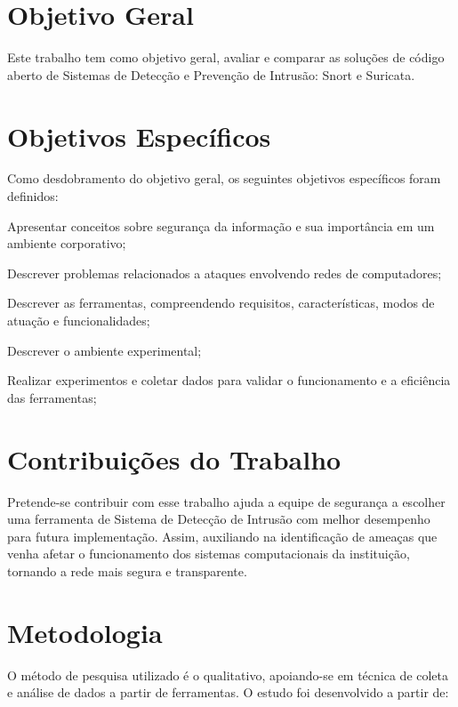 \section{Objetivo Geral} \label{sec:objectivo-geral}

Este trabalho tem como objetivo geral, avaliar e comparar as soluções de código aberto de Sistemas de Detecção e Prevenção de Intrusão: Snort e Suricata. 

\section{Objetivos Específicos} \label{sec:objetivos-especificos}

Como desdobramento do objetivo geral, os seguintes objetivos específicos foram definidos:

\begin{alineas}
\item Apresentar conceitos sobre segurança da informação e sua importância em um ambiente corporativo;
\item Descrever problemas relacionados a ataques envolvendo redes de computadores;
\item Descrever as ferramentas, compreendendo requisitos, características, modos de atuação e funcionalidades;
\item Descrever o ambiente experimental;
\item Realizar experimentos e coletar dados para validar o funcionamento e a eficiência das ferramentas;
\end{alineas}

\section{Contribuições do Trabalho}

Pretende-se contribuir com esse trabalho ajuda a equipe de segurança a escolher uma ferramenta de Sistema de Detecção de Intrusão com melhor desempenho para futura implementação. Assim, auxiliando na identificação de ameaças que venha afetar o funcionamento dos sistemas computacionais da instituição, tornando a rede mais segura e transparente.

\section{Metodologia} \label{sec:metodologia}

O método de pesquisa utilizado é o qualitativo, apoiando-se em técnica de coleta e análise de dados a partir de ferramentas. O estudo foi desenvolvido a partir de:

